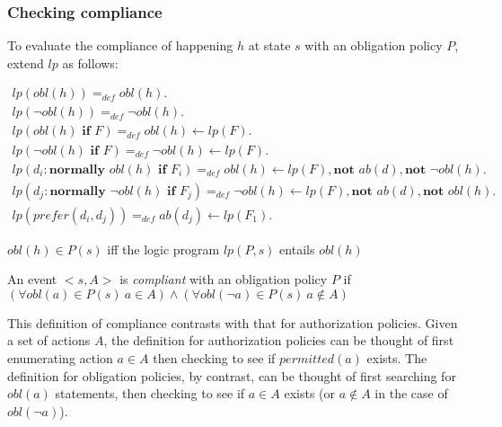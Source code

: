 \subsubsection{Checking compliance}

To evaluate the compliance of happening $h$ at state $s$ with an obligation policy $P$, \citet{gelfond_authorization_2008} extend $lp$ as follows:

\begin{gather}
    lp(obl(h)) =_{def}
        obl(h). \\
    lp(\neg obl(h)) =_{def}
        \neg obl(h). \\
    lp(obl(h) \textbf{ if } F) =_{def}
        obl(h) \leftarrow
            lp(F). \\
    lp(\neg obl(h) \textbf{ if } F) =_{def}
        \neg obl(h) \leftarrow
            lp(F). \\
    lp(d_i: \textbf{normally } obl(h) \textbf{ if } F_i) =_{def}
        obl(h) \leftarrow
            lp(F),
            \textbf{not } ab(d),
            \textbf{not } \neg obl(h). \\
    lp(d_j: \textbf{normally } \neg obl(h) \textbf{ if } F_j) =_{def}
        \neg obl(h) \leftarrow
            lp(F),
            \textbf{not } ab(d),
            \textbf{not } obl(h). \\
    lp(prefer(d_i, d_j)) =_{def}
        ab(d_j) \leftarrow lp(F_1).
\end{gather}

\begin{definition}
    $obl(h) \in P(s)$ iff the logic program $lp(P, s)$ entails $obl(h)$
\end{definition}

\begin{definition}
    \label{def:obligation_event_compliance}
    An event $<s, A>$ is \textit{compliant} with an obligation policy $P$ if $(\forall obl(a) \in P(s) \ a \in A) \land (\forall obl(\neg a) \in P(s) \ a \not \in A)$
\end{definition}

This definition of compliance contrasts with that for authorization policies.
Given a set of actions $A$, the definition for authorization policies can be thought of first enumerating action $a \in A$ then checking to see if $permitted(a)$ exists.
The definition for obligation policies, by contrast, can be thought of first searching for $obl(a)$ statements, then checking to see if $a \in A$ exists (or $a \not \in A$ in the case of $obl(\neg a)$).


